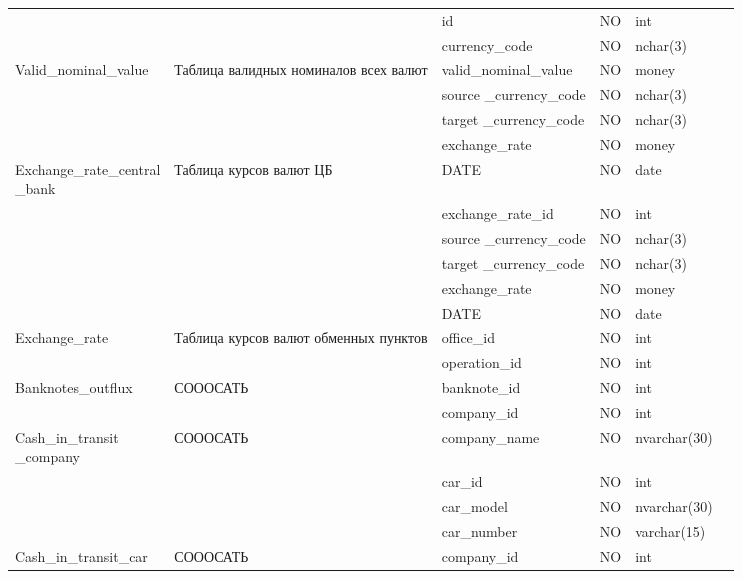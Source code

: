 \documentclass{article}
\begin{document}
\begin{center}
\begin{tabular}{|l| m{4cm}| m{3.2cm}| m{2cm}| m{2cm}| l|}
 &&id &NO&int&\\ \cline{3-6}
  	
&&currency\_code&NO&nchar(3)&\\ \cline{3-6}
 
  \multirow{-3}{*}{Valid\_nominal\_value} & \multirow{-3}{4cm}{Таблица валидных номиналов всех валют} & valid\_nominal\_value	& NO & money&\\ \hline
   	
	
 &&source \_currency\_code&NO&nchar(3)&\\ \cline{3-6}
 &&target \_currency\_code&NO&nchar(3)&\\ \cline{3-6}

&&exchange\_rate&NO&money&\\ \cline{3-6}

 \multirow{-4}{3.5cm}{Exchange\_rate\_central\\\_bank} & \multirow{-4}{3cm}{Таблица курсов валют ЦБ} & DATE& NO & date&\\ \hline
  
  


&&exchange\_rate\_id&	NO&	int&\\ \cline{3-6}

&&source \_currency\_code&	NO&	nchar(3)&\\ \cline{3-6}

&&target \_currency\_code&	NO&	nchar(3)&\\ \cline{3-6}

&&exchange\_rate&	NO&	money&\\ \cline{3-6}

&&DATE&	NO	&date&\\ \cline{3-6}

\multirow{-7}{*}{Exchange\_rate}&	\multirow{-6}{3cm}{Таблица курсов валют обменных пунктов}&		office\_id	&NO	&int&\\ \hline

&&operation\_id&	NO&	int& \\ \cline{3-6}
\multirow{-2}{*}{Banknotes\_outflux}	&\multirow{-2}{*}{СОООСАТЬ}&	banknote\_id	&NO&	int& \\ \hline


&&company\_id&	NO	&int&\\ \cline{3-6}
\multirow{-2}{3.5cm}{Cash\_in\_transit\\ \_company}&\multirow{-2}{*}{СОООСАТЬ}&company\_name&	NO&	nvarchar(30)&\\ \hline

&&car\_id&	NO&	int&\\ \cline{3-6}
&&car\_model&	NO	&nvarchar(30)&\\ \cline{3-6}
&&car\_number&	NO&	varchar(15)&\\ \cline{3-6}
\multirow{-4}{*}{Cash\_in\_transit\_car}	& \multirow{-4}{*}{СОООСАТЬ}&		company\_id&	NO&	int&\\ \hline



\end{tabular}
\end{center}
\end{document}
